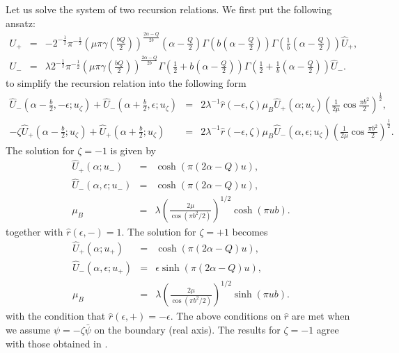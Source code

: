 \documentclass[a4paper,12pt]{article}
\newcommand{\tfrac}[2]{{\textstyle\frac{#1}{#2}}}
\newcommand{\ep}{{\epsilon}}
\begin{document}
   Let us solve the system of two recursion relations.
 We first put the following ansatz:
\begin{eqnarray}
  U_+ &=&
  -2^{-\frac{1}{2}}\pi^{-\frac{1}{2}}
   (\mu\pi\gamma(\tfrac{bQ}{2}))^{\frac{2\alpha-Q}{2b}}
   (\alpha-\tfrac{Q}{2})
  \Gamma(b(\alpha-\tfrac{Q}{2}))
  \Gamma(\tfrac{1}{b}(\alpha-\tfrac{Q}{2}))
  \hat{U}_+, \nonumber \\
  U_- &=&
  \lambda
  2^{-\frac{1}{2}}\pi^{-\frac{1}{2}}
  (\mu\pi\gamma(\tfrac{bQ}{2}))^{\frac{2\alpha-Q}{2b}}
  \Gamma(\tfrac{1}{2}+b(\alpha-\tfrac{Q}{2}))
  \Gamma(\tfrac{1}{2}+\tfrac{1}{b}(\alpha-\tfrac{Q}{2}))
  \hat{U}_-.
\end{eqnarray}
 to simplify the recursion relation into the following form
\begin{eqnarray}
  \hat{U}_-(\alpha-\tfrac{b}{2},-\ep;u_\zeta)
 +\hat{U}_-(\alpha+\tfrac{b}{2},\ep;u_\zeta)
 &=& 2\lambda^{-1}
     \hat{r}(-\ep,\zeta)\mu_B \hat{U}_+(\alpha;u_\zeta)
     \left(\tfrac{1}{2\mu}\cos\tfrac{\pi b^2}{2}\right)^{\frac{1}{2}},
 \nonumber \\
 -\zeta\hat{U}_+(\alpha-\tfrac{b}{2};u_\zeta)
 +\hat{U}_+(\alpha+\tfrac{b}{2};u_\zeta)
 &=& 2\lambda^{-1}
     \hat{r}(-\ep,\zeta)\mu_B
     \hat{U}_-(\alpha,\ep;u_\zeta)
     \left(\tfrac{1}{2\mu}\cos\tfrac{\pi b^2}{2}\right)^{\frac{1}{2}}.
\end{eqnarray}
 The solution for $\zeta=-1$ is given by
\begin{eqnarray}
  \hat{U}_+(\alpha;u_-) &=& \cosh(\pi (2\alpha-Q)u),
 \nonumber \\
  \hat{U}_-(\alpha,\ep;u_-) &=& \cosh(\pi (2\alpha-Q)u),
 \nonumber \\
  \mu_B  &=& \lambda
  \left(\tfrac{2\mu}{\cos(\pi b^2/2)}\right)^{1/2}
   \cosh(\pi u b).
\end{eqnarray}
 together with $\hat{r}(\ep,-)=1$.
 The solution for $\zeta=+1$ becomes
\begin{eqnarray}
  \hat{U}_+(\alpha;u_+) &=& \cosh(\pi (2\alpha-Q)u),
 \nonumber \\
  \hat{U}_-(\alpha,\ep;u_+) &=& \ep \sinh(\pi (2\alpha-Q)u),
 \nonumber \\
  \mu_B  &=& \lambda
  \left(\tfrac{2\mu}{\cos(\pi b^2/2)}\right)^{1/2}
  \sinh(\pi u b).
\end{eqnarray}
 with the condition that $\hat{r}(\ep,+)=-\ep$.
 The above conditions on $\hat{r}$ are met when we assume
 $\psi = -\zeta\bar{\psi}$ on the boundary (real axis).
 The results for $\zeta=-1$ agree with those obtained in \cite{ARS}.
\end{document}
